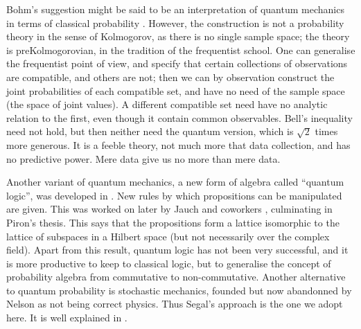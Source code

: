 Bohm's suggestion might be said to be an
interpretation of quantum mechanics in terms of classical probability
\cite{Garden}.
However, the construction is not a probability theory in the sense
of Kolmogorov, as there is no single sample space; the theory is
preKolmogorovian, in the tradition of the frequentist school.
One can generalise the frequentist point of view, and specify
that certain collections of observations are
compatible, and others are not; then we can by observation construct
the joint probabilities of each compatible set, and have no need of
the sample space (the space of joint values). A different compatible set
need have no analytic relation to the first, even though it contain
common observables. Bell's inequality need not hold, but then
neither need the quantum version, which is $\surd 2$ times
more generous. It is a feeble theory, not much more that data
collection, and has no predictive power. Mere data give us no
more than mere data.

Another variant of quantum mechanics, a new form of algebra
called ``quantum logic'', was developed in
\cite{Birkhoff2}. New rules by which propositions can be
manipulated are given. This was worked on later by Jauch and coworkers \cite{Jauch},
culminating in Piron's thesis. This says that the propositions
form a lattice isomorphic to the
lattice of subspaces in a Hilbert space (but not necessarily over the
complex field). Apart from this result, quantum logic has not been very
successful, and it is more productive to keep to
classical logic, but to generalise the concept of probability algebra
from commutative to non-commutative. Another alternative to
quantum probability is stochastic
mechanics, founded but now abandonned by Nelson \cite{Nelson4}
as not being correct physics. Thus Segal's approach is the one we adopt here.
It is well explained in \cite{Emch,Haag,Horuzhy}.


